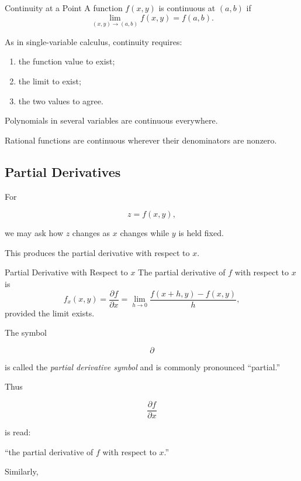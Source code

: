\begin{definitionbox}{Continuity at a Point}
A function \(f(x,y)\) is continuous at \((a,b)\) if
\[ \lim_{(x,y)\to(a,b)}f(x,y)=f(a,b). \]
\end{definitionbox}

As in single-variable calculus, continuity requires:

\begin{enumerate}
    \item the function value to exist;
    \item the limit to exist;
    \item the two values to agree.
\end{enumerate}

Polynomials in several variables are continuous everywhere.

Rational functions are continuous wherever their denominators are nonzero.

\subsection{Partial Derivatives}
\label{subsec:partial-derivatives}

For

\[ z=f(x,y), \]

we may ask how \(z\) changes as \(x\) changes while \(y\) is held fixed.

This produces the partial derivative with respect to \(x\).

\begin{definitionbox}{Partial Derivative with Respect to \(x\)}
The partial derivative of \(f\) with respect to \(x\) is
\[ f_x(x,y)=\frac{\partial f}{\partial x}
=\lim_{h\to0}\frac{f(x+h,y)-f(x,y)}{h}, \]
provided the limit exists.
\end{definitionbox}

The symbol

\[ \partial \]

is called the \emph{partial derivative symbol} and is commonly pronounced
``partial.''

Thus

\[ \frac{\partial f}{\partial x} \]

is read:

``the partial derivative of \(f\) with respect to \(x\).''

Similarly,

